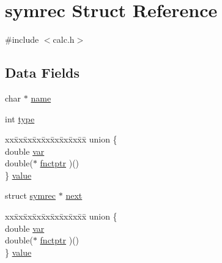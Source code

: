 \hypertarget{structsymrec}{\section{symrec Struct Reference}
\label{structsymrec}
}


{\ttfamily \#include $<$calc.\+h$>$}

\subsection*{Data Fields}
\begin{DoxyCompactItemize}
\item 
char $\ast$ \hyperlink{structsymrec_a202440ab579645f6c8296a45aa20d58d}{name}
\item 
int \hyperlink{structsymrec_a3ed0bae32ad0e16423a49153484094f8}{type}
\item 
\begin{tabbing}
xx\=xx\=xx\=xx\=xx\=xx\=xx\=xx\=xx\=\kill
union \{\\
\>double \hyperlink{structsymrec_af3db0c7e569f93a9d7385d5b170578f8}{var}\\
\>double($\ast$ \hyperlink{structsymrec_a841939294a168dadc7dc230596f932ca}{fnctptr} )()\\
\} \hyperlink{structsymrec_aabe0b508928c6472fcbdf5071c33b61a}{value}\\

\end{tabbing}\item 
struct \hyperlink{structsymrec}{symrec} $\ast$ \hyperlink{structsymrec_ad421f0b40359009924d809424295fa8e}{next}
\item 
\begin{tabbing}
xx\=xx\=xx\=xx\=xx\=xx\=xx\=xx\=xx\=\kill
union \{\\
\>double \hyperlink{structsymrec_af3db0c7e569f93a9d7385d5b170578f8}{var}\\
\>double($\ast$ \hyperlink{structsymrec_a841939294a168dadc7dc230596f932ca}{fnctptr} )()\\
\} \hyperlink{structsymrec_a6010894d0620b4f8aadf53477259e21a}{value}\\

\end{tabbing}\end{DoxyCompactItemize}


